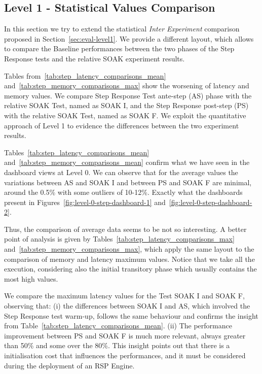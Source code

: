 \subsection{Level 1 - Statistical Values Comparison}\label{sec:level1-step-stats}


In this section we try to extend the statistical \textit{Inter Experiment} comparison proposed in Section~\ref{sec:eval-level1}. We provide a different layout, which allows to compare the Baseline performances between the two phases of the Step Response tests and the relative SOAK experiment results.

Tables from~\ref{tab:step_latency_comparisons_mean} and~\ref{tab:step_memory_comparisons_max} show the worsening of latency and memory values. We compare Step Response Test ante-step (AS) phase with the relative SOAK Test, named as SOAK I, and the Step Response post-step (PS) with the relative SOAK Test, named as SOAK F.  We exploit the quantitative approach of Level 1 to evidence the differences between the two experiment results.


Tables~\ref{tab:step_latency_comparisons_mean} and~\ref{tab:step_memory_comparisons_mean} confirm what we have seen in the dashboard views at Level 0. We can observe that for the average values the variations between AS and SOAK I and between PS and SOAK F are minimal, around the 0.5\%  with some outliers of 10-12\%. Exactly what the dashboards present in Figures~\ref{fig:level-0-step-dashboard-1} and~\ref{fig:level-0-step-dashboard-2}. 

Thus, the comparison of average data seems to be not so interesting. A better point of analysis is given by Tables~\ref{tab:step_latency_comparisons_max} and~\ref{tab:step_memory_comparisons_max}, which apply the same layout to the comparison of memory and latency maximum values. Notice that we take all the execution, considering also the initial transitory phase which usually contains the most high values.

We compare the maximum latency values for the Test SOAK I and SOAK F, observing that: (i) the differences between SOAK I and AS, which involved the Step Response test warm-up, follows the same behaviour and confirms the insight from Table~\ref{tab:step_latency_comparisons_mean}. (ii) The performance improvement between PS and SOAK F is much more relevant, always greater than 50\% and some over the 80\%. This insight points out that there is a initialisation cost that influences the performances, and it must be considered during the deployment of an RSP Engine. 

